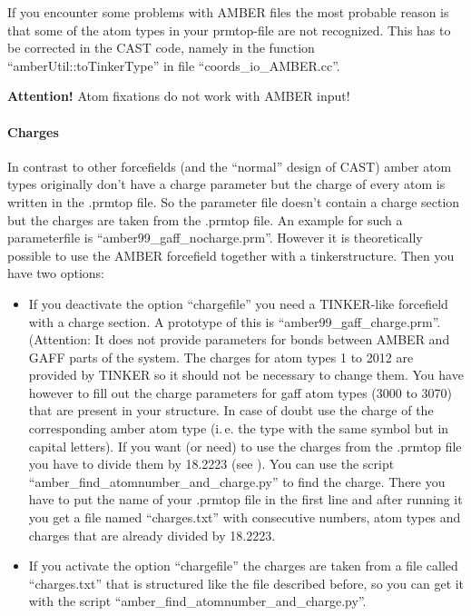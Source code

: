 \documentclass[10pt,a4paper]{article} %
\begin{document}
If you encounter some problems with \ac{AMBER} files the most probable reason is that some of the atom types in your prmtop-file are not recognized. This has to be corrected in the \ac{CAST} code, namely in the function ``amberUtil::toTinkerType'' in file ``coords\_io\_AMBER.cc''.

\textbf{Attention!} Atom fixations do not work with AMBER input!

\paragraph{Charges}

In contrast to other forcefields (and the ``normal'' design of CAST) amber atom types originally don't have a charge parameter but the charge of every atom is written in the .prmtop file. So the parameter file doesn't contain a charge section but the charges are taken from the .prmtop file. An example for such a parameterfile is ``amber99\_gaff\_nocharge.prm''. However it is theoretically possible to use the AMBER forcefield together with a tinkerstructure. Then you have two options:
\begin{itemize}
\item If you deactivate the option ``chargefile'' you need a TINKER-like forcefield with a charge section. A prototype of this is ``amber99\_gaff\_charge.prm''. (Attention: It does not provide parameters for bonds between AMBER and GAFF parts of the system. The charges for atom types 1 to 2012 are provided by TINKER so it should not be necessary to change them. You have however to fill out the charge parameters for gaff atom types (3000 to 3070) that are present in your structure. In case of doubt use the charge of the corresponding amber atom type (i.\,e. the type with the same symbol but in capital letters). If you want (or need) to use the charges from the .prmtop file you have to divide them by 18.2223 (see \cite{noauthor_amber_nodate}). You can use the script ``amber\_find\_atomnumber\_and\_charge.py'' to find the charge. There you have to put the name of your .prmtop file in the first line and after running it you get a file named ``charges.txt'' with consecutive numbers, atom types and charges that are already divided by 18.2223.
\item If you activate the option ``chargefile'' the charges are taken from a file called ``charges.txt'' that is structured like the file described before, so you can get it with the script ``amber\_find\_atomnumber\_and\_charge.py''.
\end{itemize}
\end{document}
